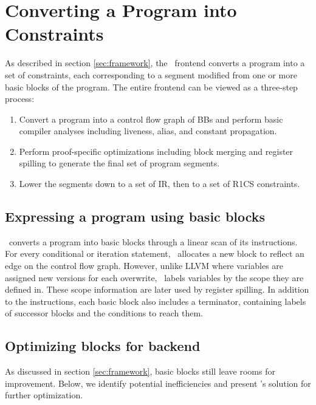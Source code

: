 \section{Converting a Program into Constraints} \label{sec:frontend}

As described in section \ref{sec:framework}, the \CoBBl~frontend converts a program into a set of constraints, each corresponding to a segment modified from one or more basic blocks of the program. The entire frontend can be viewed as a three-step process:
\begin{enumerate}
    \item Convert a program into a control flow graph of BBs and perform basic compiler analyses including liveness, alias, and constant propagation. \label{step:convert}
    \item Perform proof-specific optimizations including block merging and register spilling to generate the final set of program segments. \label{step:optimize}
    \item Lower the segments down to a set of IR, then to a set of R1CS constraints. \label{step:lower}
\end{enumerate}

\subsection{Expressing a program using basic blocks}
\CoBBl~converts a program into basic blocks through a linear scan of its instructions. For every conditional or iteration statement, \CoBBl~allocates a new block to reflect an edge on the control flow graph. However, unlike LLVM where variables are assigned new versions for each overwrite, \CoBBl~labels variables by the scope they are defined in. These scope information are later used by register spilling. In addition to the instructions, each basic block also includes a terminator, containing labels of successor blocks and the conditions to reach them.

\subsection{Optimizing blocks for backend}
As discussed in section \ref{sec:framework}, basic blocks still leave rooms for improvement. Below, we identify potential inefficiencies and present \CoBBl's solution for further optimization.


